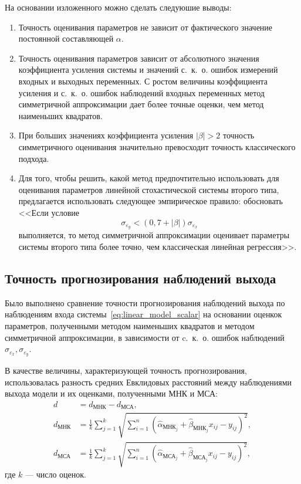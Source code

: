 \pagebreak
На основании изложенного можно сделать следуюшие выводы:
\begin{enumerate}
\item Точность оценивания параметров не зависит от фактического значение постоянной
  составляющей \( \alpha \).
\item Точность оценивания параметров зависит от абсолютного значения коэффициента усиления системы и
  значений с.~к.~о. ошибок измерений входных и выходных переменных.
  С ростом величины коэффициента усиления и с.~к.~о. ошибок наблюдений
  входных переменных метод симметричной аппроксимации дает более точные оценки,
  чем метод наименьших квадратов.
\item При больших значениях коэффициента усиления \( |\beta| > 2 \)
  точность симметричного оценивания значительно превосходит
  точность классического подхода.
\item Для того, чтобы решить, какой метод предпочтительно использовать для оценивания параметров
  линейной стохастической системы второго типа,
  предлагается использовать следующее эмпирическое правило: {\color{red} обосновать}
  <<Если условие
  \begin{equation}
    \sigma_{\varepsilon_y} < (0{,}7 + |\beta|) \sigma_{\varepsilon_x}
    \label{eq:rule_linear_param}
  \end{equation}
  выполняется, то метод симметричной аппроксимации оценивает параметры системы
  второго типа более точно, чем классическая линейная регрессия>>.
\end{enumerate}

\pagebreak
\subsection{Точность прогнозирования наблюдений выхода}

Было выполнено сравнение точности прогнозирования наблюдений выхода по
наблюдениям входа системы~\eqref{eq:linear_model_scalar} на основании оценкок параметров,
полученными методом наименьших квадратов и методом симметричной аппроксимации,
в зависимости от c.~к.~о. ошибок наблюдений \( \sigma_{\varepsilon_x}, \sigma_{\varepsilon_y} \).

В качестве величины, характеризующей точность прогнозирования,
использовалась разность средних Евклидовых расстояний между наблюдениями выхода модели и
их оценками, полученными МНК и МСА:
\begin{equation*}
  \begin{aligned}
    d &= d_{\text{МНК}} - d_{\text{МСА}}, \\
    d_{\text{МНК}} &= \frac{1}{k} \sum_{j=1}^k \sqrt{ \sum_{i=1}^n (\hat{\alpha}_{\text{МНК}_j} + \hat{\beta}_{\text{МНК}_j} x_{ij} - y_{ij})^2}, \\
    d_{\text{МСА}} &= \frac{1}{k} \sum_{j=1}^k \sqrt{ \sum_{i=1}^n (\hat{\alpha}_{\text{МСА}_j} + \hat{\beta}_{\text{МСА}_j} x_{ij} - y_{ij})^2},
    \end{aligned}
  \end{equation*}
где \( k \) --- число оценок.

